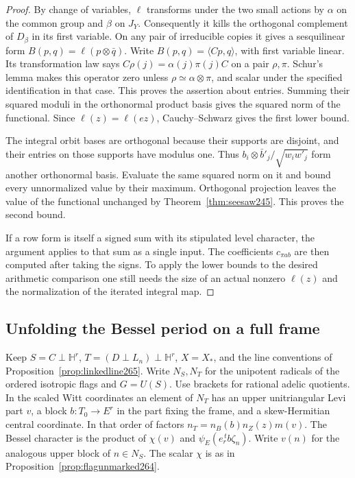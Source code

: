 \documentclass[a4paper,11pt]{article}
\theoremstyle{definition}
\theoremstyle{remark}
\numberwithin{equation}{section}
\begin{document}
\begin{proof}
By change of variables, \(\ell\) transforms under the two small
actions by \(\alpha\) on the common group and \(\beta\) on \(J_Y\).
Consequently it kills the orthogonal complement of \(D_\beta\)
in its first variable. On any pair of irreducible copies it
gives a sesquilinear form \(B(p,q)=\ell(p\otimes\bar q)\).
Write \(B(p,q)=\langle Cp,q\rangle\), with first variable linear.
Its transformation law says
\(C\rho(j)=\alpha(j)\pi(j)C\) on a pair \(\rho,\pi\).
Schur's lemma makes this operator zero unless
\(\rho\simeq\alpha\otimes\pi\), and scalar under the specified
identification in that case. This proves the assertion about
entries. Summing their squared moduli in the orthonormal product
basis gives the squared norm of the functional. Since
\(\ell(z)=\ell(ez)\), Cauchy--Schwarz gives the first lower bound.

The integral orbit bases are orthogonal because their supports
are disjoint, and their entries on those supports have modulus one.
Thus \(b_i\otimes\bar b'_j/\sqrt{w_iw'_j}\) form another
orthonormal basis. Evaluate the same squared norm on it and bound
every unnormalized value by their maximum. Orthogonal projection
leaves the value of the functional unchanged by
Theorem~\ref{thm:seesaw245}. This proves the second bound.

If a row form is itself a signed sum with its stipulated level
character, the argument applies to that sum as a single input.
The coefficients \(c_{\pi ab}\) are then computed after taking
the signs. To apply the lower bounds to the desired arithmetic
comparison one still needs the size of an actual nonzero
\(\ell(z)\) and the normalization of the iterated integral map.
\end{proof}

\subsection{Unfolding the Bessel period on a full frame}\label{nav:VII-43}
Keep \(S=C\perp\mathbb H^r\), \(T=(D\perp L_n)\perp\mathbb H^r\),
\(X=X_*\), and the line conventions of
Proposition~\ref{prop:linkedline265}. Write \(N_S,N_T\) for the
unipotent radicals of the ordered isotropic flags and \(G=U(S)\).
Use brackets for rational adelic quotients. In the scaled
Witt coordinates an element of \(N_T\) has an upper unitriangular
Levi part \(v\), a block \(b:T_0\to E^r\) in the part fixing
the frame, and a skew-Hermitian central coordinate. In that
order of factors \(n_T=n_B(b)n_Z(z)m(v)\). The Bessel character
is the product of \(\chi(v)\) and \(\psi_E(e_r^{\,t}b\zeta_n)\).
Write \(v(n)\) for the analogous upper block of \(n\in N_S\).
The scalar \(\chi\) is as in Proposition~\ref{prop:flagunmarked264}.
\end{document}
